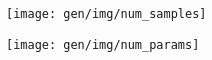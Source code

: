 \centering
\begin{subfigure}[h]{.45\textwidth}
  \centering
  \texttt{[image: gen/img/num\_samples]}
  \caption{}
\end{subfigure}
\hfill
\begin{subfigure}[h]{.45\textwidth}
  \centering
  \texttt{[image: gen/img/num\_params]}
  \caption{}
\end{subfigure}
